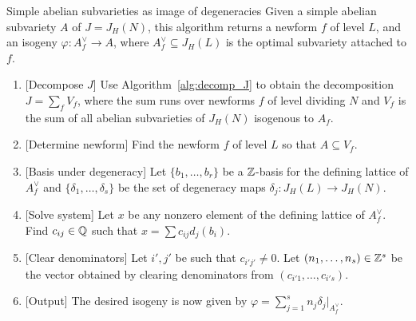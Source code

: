\begin{algorithm}{Simple abelian subvarieties as image of degeneracies}%
    \label{alg:simple_degen}
    Given a simple abelian subvariety $A$ of $J=J_H(N)$, this algorithm returns
    a newform $f$ of level $L$, and an isogeny $\varphi:A_f ^\vee\to A$, where
    $A_f ^\vee\subseteq J_H(L)$ is the optimal subvariety attached to $f$.
    \begin{enumerate}
        \item{} [Decompose $J$]
            Use Algorithm~\ref{alg:decomp_J} to obtain the decomposition
            $J=\sum_f V_f$, where the sum runs over newforms $f$ of level
            dividing $N$ and $V_f$ is the sum of all abelian subvarieties of
            $J_H(N)$ isogenous to $A_f$.
        \item{} [Determine newform]
            Find the newform $f$ of level $L$ so that $A\subseteq V_f$.
        \item{} [Basis under degeneracy]
            Let $\{b_1,\ldots,b_r\}$ be a $\mathbb{Z}$-basis for the defining lattice
            of $A_f^\vee$ and $\{\delta_1,\ldots,\delta_s\}$ be the set of degeneracy
            maps $\delta_j:J_H(L)\to J_H(N)$.
        \item{} [Solve system]
            Let $x$ be any nonzero element of the defining lattice of
            $A_f^\vee$. Find $c_{ij}\in \mathbb{Q}$ such that $x=\sum c_{ij}
            d_j(b_i)$.
        \item{} [Clear denominators]
            Let $i', j'$ be such that $c_{i'j'}\neq 0$. Let
            $(n_1,\ldots,n_s)\in \mathbb{Z}^s$ be the vector obtained by
            clearing denominators from $(c_{i'1},\ldots,c_{i's})$.
        \item{} [Output]
            The desired isogeny is now given by $\varphi=\sum_{j=1} ^s n_j
            \delta_j|_{A_f ^\vee}$.
    \end{enumerate}
\end{algorithm}


